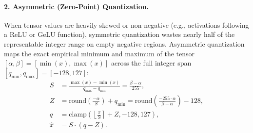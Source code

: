 \documentclass[../../../main.tex]{subfiles}
\begin{document}
\paragraph{2. Asymmetric (Zero-Point) Quantization.}
When tensor values are heavily skewed or non-negative (e.g., activations following a ReLU or GeLU function), symmetric quantization wastes nearly half of the representable integer range on empty negative regions. Asymmetric quantization maps the exact empirical minimum and maximum of the tensor $[\alpha, \beta] = [\min(x), \max(x)]$ across the full integer span $[q_{\min}, q_{\max}] = [-128, 127]$:
\begin{align}
\label{eq:zeropoint_scale}
S &= \frac{\max(x) - \min(x)}{q_{\max} - q_{\min}} = \frac{\beta - \alpha}{255}, \\
\label{eq:zeropoint_z}
Z &= \text{round}\left(\frac{-\alpha}{S}\right) + q_{\min} = \text{round}\left(\frac{-255 \cdot \alpha}{\beta - \alpha}\right) - 128, \\
\label{eq:zeropoint_quant}
q &= \text{clamp}\left(\left\lfloor \frac{x}{S} \right\rceil + Z, -128, 127\right), \\
\label{eq:zeropoint_dequant}
\hat{x} &= S \cdot (q - Z).
\end{align}
\end{document}
